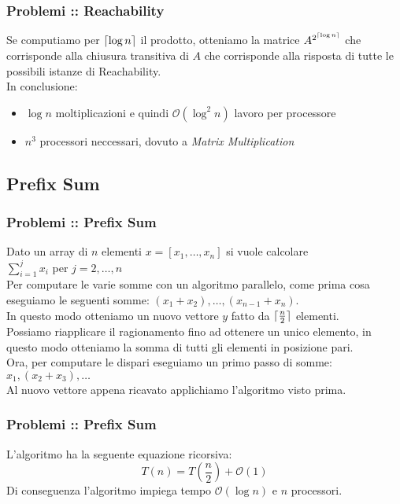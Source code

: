 \documentclass{beamer}
\newcommand{\bigO}{\ensuremath{\mathcal{O}}} %
\DeclarePairedDelimiter{\ceil}{\lceil}{\rceil} %
\begin{document}
\begin{frame}
	\frametitle{Problemi :: Reachability} %

	Se computiamo per $\ceil{\log n}$ il prodotto, otteniamo la matrice $A^{2^{\ceil{\log n}}}$ che corrisponde alla chiusura transitiva di $A$ che corrisponde alla risposta di tutte le possibili istanze di Reachability.\\
	In conclusione:
	\begin{itemize}
		\item $\log n$ moltiplicazioni e quindi $\bigO{(\log^2 n)}$ lavoro per processore
		\item $n^3$ processori neccessari, dovuto a \emph{Matrix Multiplication}
	\end{itemize}
	
\end{frame}

\subsection{Prefix Sum}
\begin{frame}
	\frametitle{Problemi :: Prefix Sum} %
	
	Dato un array di $n$ elementi $x = [x_1,\dots,x_n]$ si vuole calcolare\\ $\sum_{i=1}^{j} x_i$ per $j=2,\dots,n$\\
	Per computare le varie somme con un algoritmo parallelo, come prima cosa eseguiamo le seguenti somme: $(x_1 + x_2),\dots,(x_{n-1} + x_n)$.\\
	In questo modo otteniamo un nuovo vettore $y$ fatto da $\ceil{\frac{n}{2}}$ elementi.\\
	Possiamo riapplicare il ragionamento fino ad ottenere un unico elemento, in questo modo otteniamo la somma di tutti gli elementi in posizione pari.\\
	Ora, per computare le dispari eseguiamo un primo passo di somme: $x_1,(x_2+x_3), \dots$\\
	Al nuovo vettore appena ricavato applichiamo l'algoritmo visto prima.
	
\end{frame}

\begin{frame}
	\frametitle{Problemi :: Prefix Sum} %
	
	
	L'algoritmo ha la seguente equazione ricorsiva:
	\begin{equation}
	T(n) = T\left(\frac{n}{2}\right) + \bigO{(1)}
	\end{equation}
	Di conseguenza l'algoritmo impiega tempo $\bigO{(\log n)}$ e $n$ processori.
	
\end{frame}
\end{document}
